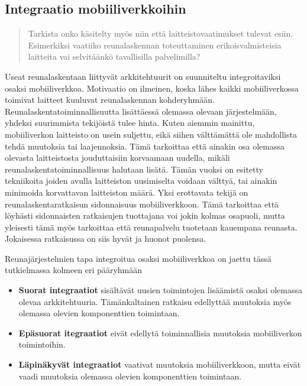 
\subsection{Integraatio mobiiliverkkoihin} \label{integraatio}
\begin{quote}
Tarkista onko käsitelty myös niin että laitteistovaatimukset tulevat esiin. Esimerkiksi vaatiiko reunalaskennan toteuttaminen erikoisvalmisteisia laitteita vai selvitäänkö tavallisilla palvelimilla?
\end{quote}


Useat reunalaskentaan liittyvät arkkitehtuurit on suunniteltu integroitaviksi osaksi mobiiliverkkoa.
Motivaatio on ilmeinen, koska lähes kaikki mobiiliverkossa toimivat laitteet kuuluvat reunalaskennan kohderyhmään.
Reunalaskentatoiminnallisuutta lisättäessä olemassa olevaan järjestelmään, yhdeksi suurimmista tekijöistä tulee hinta. 
Kuten aiemmin mainittu, mobiiliverkon laitteisto on usein suljettu, eikä siihen välttämättä ole mahdollista tehdä muutoksia tai laajennoksia.
Tämä tarkoittaa että ainakin osa olemassa olevasta laitteistosta jouduttaisiin korvaamaan uudella, mikäli reunalaskentatoiminnallisuus halutaan lisätä.
Tämän vuoksi on esitetty tekniikoita joiden avulla laitteiston uusimiselta voidaan välttyä, tai ainakin minimoida korvattavan laitteiston määrä.
Yksi erottavata tekijä on reunalaskentaratkaisun sidonnaisuus mobiiliverkkoon. Tämä tarkoittaa että löyhästi sidonnaisten ratkaisujen tuottajana voi jokin kolmas osapuoli, mutta yleisesti tämä myös tarkoittaa että reunapalvelu tuotetaan kauempana reunasta.
Jokaisessa ratkaisussa on siis hyvät ja huonot puolensa. 

Reunajärjestelmien tapa integroitua osaksi mobiiliverkkoa on jaettu tässä tutkielmassa kolmeen eri pääryhmään

\begin{itemize}
\item \textbf{Suorat integraatiot} sisältävät uusien toimintojen lisäämistä osaksi olemassa olevaa arkkitehtuuria. Tämänkaltainen ratkaisu edellyttää muutoksia myös olemassa olevien komponenttien toimintaan. 
\item \textbf{Epäsuorat itegraatiot} eivät edellytä toiminnallisia muutoksia mobiiliverkon toimintoihin.
\item \textbf{Läpinäkyvät integraatiot} vaativat muutoksia mobiiliverkkoon, mutta eivät vaadi muutoksia olemassa olevien komponenttien toimintaan.
\end{itemize}

